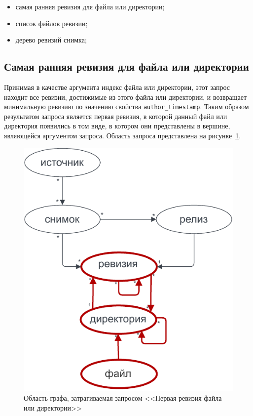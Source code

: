 \documentclass[times,specification,annotation]{itmo-student-thesis}
\begin{document}
\begin{itemize}
    \item самая ранняя ревизия для файла или директории;
    \item список файлов ревизии;
    \item дерево ревизий снимка;
\end{itemize}

\subsection{Самая ранняя ревизия для файла или директории}

Принимая в качестве аргумента индекс файла или директории, этот запрос находит все ревизии, достижимые из этого файла или директории, и возвращает минимальную ревизию по значению свойства \texttt{author\_timestamp}. Таким образом результатом запроса является первая ревизия, в которой данный файл или директория появились в том виде, в котором они представлены в вершине, являющейся аргументом запроса. Область запроса представлена на рисунке~\ref{ecr-graph}.

\begin{figure}[!h]
\caption{Область графа, затрагиваемая запросом <<Первая ревизия файла или директории>>}\label{ecr-graph}
\centering
\includegraphics{img/ecr-graph.pdf}
\end{figure}
\end{document}
